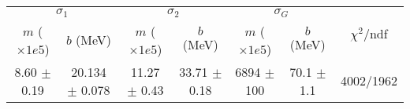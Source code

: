\begin{tabular}{cc|cc|cc||c}
\multicolumn{2}{c|}{$\sigma_1$} & \multicolumn{2}{|c}{$\sigma_2$} & \multicolumn{2}{|c}{$\sigma_G$}  & \multirow{2}{*}{$\chi^2/$ndf}\\
$m$ ($\times1e5$) & $b$ (MeV) & $m$ ($\times1e5$) & $b$ (MeV) & $m$ ($\times1e5$) & $b$ (MeV) & \\
\hline
8.60 $\pm$ 0.19 & 20.134 $\pm$ 0.078 & 11.27 $\pm$ 0.43 & 33.71 $\pm$ 0.18 & 6894 $\pm$ 100 & 70.1 $\pm$ 1.1 & 4002/1962\\
\end{tabular}
